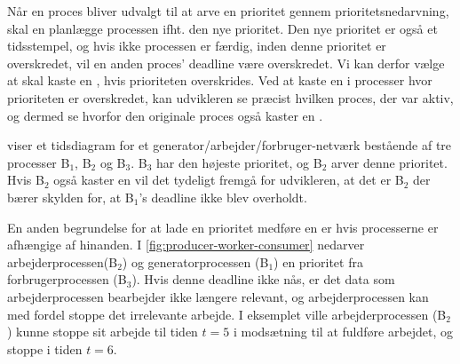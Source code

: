 Når en proces bliver udvalgt til at arve en prioritet gennem prioritetsnedarvning, skal \sched en  planlægge processen ifht. den nye prioritet.
Den nye prioritet er også et tidsstempel, og hvis ikke processen er færdig, inden denne prioritet er overskredet, vil en anden proces' deadline være overskredet. 
Vi kan derfor vælge at  skal kaste en  ,  hvis  prioriteten overskrides. Ved at kaste en  i processer hvor prioriteten er overskredet, kan udvikleren se præcist hvilken proces, der var aktiv, og dermed se hvorfor den originale proces også kaster en . 

 viser et tidsdiagram for et generator/arbejder/forbruger-netværk bestående af tre processer B$_1$, B$_2$ og B$_3$. B$_3$ har den højeste prioritet, og B$_2$ arver denne prioritet. Hvis B$_2$ også kaster en  vil det tydeligt fremgå for udvikleren, at det er B$_2$ der bærer skylden for, at B$_1$'s deadline ikke blev overholdt.

En anden begrundelse for at lade en prioritet medføre en  er hvis processerne er afhængige af hinanden. I \cref{fig:producer-worker-consumer}  nedarver  arbejderprocessen(B$_2$) og generatorprocessen (B$_1$) en  prioritet fra forbrugerprocessen (B$_3$). Hvis denne deadline ikke nås, er det data som arbejderprocessen bearbejder ikke længere relevant, og arbejderprocessen kan med fordel stoppe det irrelevante arbejde. I eksemplet ville arbejderprocessen (B$_2$) kunne stoppe sit arbejde til tiden $t = 5$ i modsætning til at fuldføre arbejdet, og stoppe i tiden $t = 6$.

